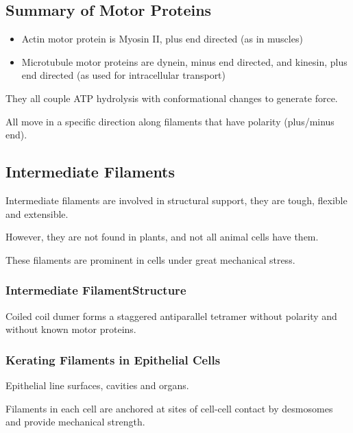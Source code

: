 \documentclass[11pt]{scrartcl}
\begin{document}

\subsection{Summary of Motor Proteins}

\begin{itemize}
\item Actin motor protein is Myosin II, plus end directed (as in muscles)
\item Microtubule motor proteins are dynein, minus end directed, and kinesin, plus end directed (as used for intracellular transport)
\end{itemize}

They all couple ATP hydrolysis with conformational changes to generate
force.

All move in a specific direction along filaments that have polarity
(plus/minus end).

\subsection{Intermediate Filaments}

Intermediate filaments are involved in structural support, they are
tough, flexible and extensible.

However, they are not found in plants, and not all animal cells have them. 

These filaments are prominent in cells under great mechanical stress.
\subsubsection{Intermediate FilamentStructure}

Coiled coil dumer forms a staggered antiparallel tetramer without
polarity and without known motor proteins.

\subsubsection{Kerating Filaments in Epithelial Cells}

Epithelial line surfaces, cavities and organs.

Filaments in each cell are anchored at sites of cell-cell contact by
desmosomes and provide mechanical strength.
\end{document}
